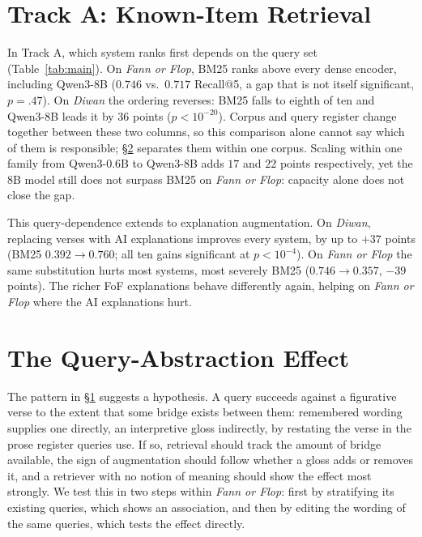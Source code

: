 \documentclass[11pt]{article}
\begin{document}
\section{Track A: Known-Item Retrieval}
\label{sec:tracka}

In Track A, which system ranks first depends on the query set (Table~\ref{tab:main}). On \textit{Fann or Flop}, BM25 ranks above every dense encoder, including Qwen3-8B ($0.746$ vs.\ $0.717$ Recall@5, a gap that is not itself significant, $p{=}.47$). On \textit{Diwan} the ordering reverses: BM25 falls to eighth of ten and Qwen3-8B leads it by 36 points ($p<10^{-20}$). Corpus and query register change together between these two columns, so this comparison alone cannot say which of them is responsible; \S\ref{sec:bridge} separates them within one corpus. Scaling within one family from Qwen3-0.6B to Qwen3-8B adds $17$ and $22$ points respectively, yet the 8B model still does not surpass BM25 on \textit{Fann or Flop}: capacity alone does not close the gap.

This query-dependence extends to explanation augmentation. On \textit{Diwan}, replacing verses with AI explanations improves every system, by up to $+37$ points (BM25 $0.392\!\rightarrow\!0.760$; all ten gains significant at $p<10^{-4}$). On \textit{Fann or Flop} the same substitution hurts most systems, most severely BM25 ($0.746\!\rightarrow\!0.357$, $-39$ points). The richer FoF explanations behave differently again, helping on \textit{Fann or Flop} where the AI explanations hurt.

\begin{table}[t]
\centering\small

\caption{Track A, Recall@5, one pipeline throughout. Stars mark a significant change from that system's verse baseline (paired exact McNemar, Holm-corrected across the ten systems within each corpus and contrast): $^{*}p{<}.05$, $^{**}p{<}.01$, $^{***}p{<}.001$. Confidence intervals in Appendix~\ref{app:full}. BM25 ranks first on \textit{Fann or Flop} and eighth on \textit{Diwan}; augmentation reverses sign between the two.}
\label{tab:main}
\end{table}

\section{The Query-Abstraction Effect}
\label{sec:bridge}

The pattern in \S\ref{sec:tracka} suggests a hypothesis. A query succeeds against a figurative verse to the extent that some bridge exists between them: remembered wording supplies one directly, an interpretive gloss indirectly, by restating the verse in the prose register queries use. If so, retrieval should track the amount of bridge available, the sign of augmentation should follow whether a gloss adds or removes it, and a retriever with no notion of meaning should show the effect most strongly. We test this in two steps within \textit{Fann or Flop}: first by stratifying its existing queries, which shows an association, and then by editing the wording of the same queries, which tests the effect directly.
\end{document}
